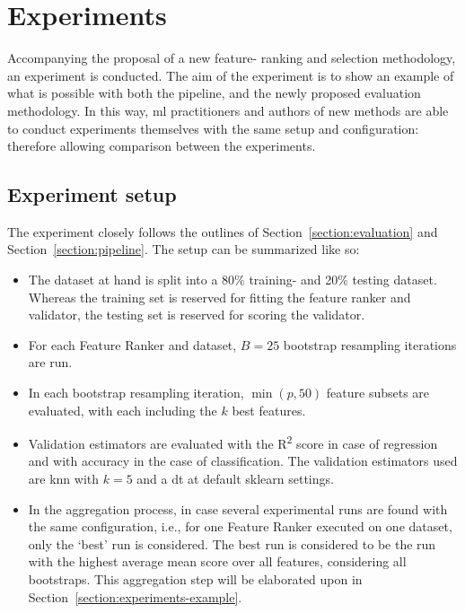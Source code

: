\documentclass[../main.tex]{subfiles}
\begin{document}
\section{Experiments}\label{section:experiments}
Accompanying the proposal of a new feature- ranking and selection methodology, an experiment is conducted. The aim of the experiment is to show an example of what is possible with both the pipeline, and the newly proposed evaluation methodology. In this way, \gls{ml} practitioners and authors of new methods are able to conduct experiments themselves with the same setup and configuration: therefore allowing comparison between the experiments.



\subsection{Experiment setup}
The experiment closely follows the outlines of Section~\ref{section:evaluation} and Section~\ref{section:pipeline}. The setup can be summarized like so:

\begin{itemize}
    \item The dataset at hand is split into a 80\% training- and 20\% testing dataset. Whereas the training set is reserved for fitting the feature ranker and validator, the testing set is reserved for scoring the validator.
    \item For each Feature Ranker and dataset, $B = 25$ bootstrap resampling iterations are run.
    \item In each bootstrap resampling iteration, $\min (p, 50)$ feature subsets are evaluated, with each including the $k$ best features.
    \item Validation estimators are evaluated with the R\textsuperscript{2} score in case of regression and with accuracy in the case of classification. The validation estimators used are \gls{knn} with $k=5$ and a \gls{dt} at default sklearn settings.
    \item In the aggregation process, in case several experimental runs are found with the same configuration, i.e., for one Feature Ranker executed on one dataset, only the `best' run is considered. The best run is considered to be the run with the highest average mean score over all features, considering all bootstraps. This aggregation step will be elaborated upon in Section~\ref{section:experiments-example}.
\end{itemize}
\end{document}
